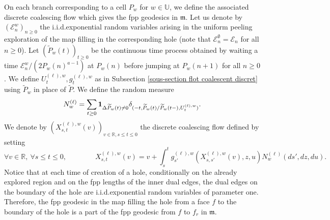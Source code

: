\documentclass[11pt]{article}
\numberwithin{equation}{section}
\def \R{\mathbb {R}}
\def \N{\mathbb{N}}
\def \U{\mathbb{U}}
\begin{document}
On each branch corresponding to a cell $P_w$ for $w \in \U$, we define the associated discrete coalescing flow which gives the fpp geodesics in $\mathfrak{m}$. Let us denote by $(\mathcal{E}^w_n)_{n\ge 0}$ the i.i.d.\@ exponential random variables arising in the uniform peeling exploration of the map filling in the corresponding hole (note that $\mathcal{E}^\emptyset_n = \mathcal{E}_n$ for all $n \ge 0$). Let $(\widetilde{P}_w(t))_{t\ge 0}$ be the continuous time process obtained by waiting a time $\mathcal{E}^w_n/{(2P_w(n)^{a-1})}$ at $P_w(n)$ before jumping at $P_w(n+1)$ for all $n\ge 0$. We define $U^{(\ell),w}_{t}, g^{(\ell), w}_t$  as in Subsection \ref{sous-section flot coalescent discret} using $\widetilde{P}_w$ in place of $\widetilde{P}$. We define the random measure
$$
N_w^{(\ell)}= \sum_{t \ge 0  } {\bf 1}_{\Delta \widetilde{P}_w(t) \neq 0}\delta_{(-t,\widetilde{P}_w(t)/\widetilde{P}_w(t-), U^{(\ell),w}_t)}.
$$
 We denote by $(X^{(\ell),w}_{s,t}(v))_{v \in \R, s\le t \le 0}$ the discrete coalescing flow defined by setting
 $$
 \forall v \in \R, \ \forall s \le t \le 0, \qquad \qquad
 X^{(\ell),w}_{s,t} (v)= v
 +\int_s^t g_{s'}^{(\ell),w} ( X^{(\ell),w}_{s,s'}(v), z, u) N^{(\ell)}_w(ds',dz,du).
 $$
 Notice that at each time of creation of a hole, conditionally on the already explored region and on the fpp lengths of the inner dual edges, the dual edges on the boundary of the hole are i.i.d.\@ exponential random variables of parameter one. %
 Therefore, the fpp geodesic in the map filling the hole from a face $f$ to the boundary of the hole is a part of the fpp geodesic from $f$ to $f_r$ in $\mathfrak{m}$.
 
\end{document}
